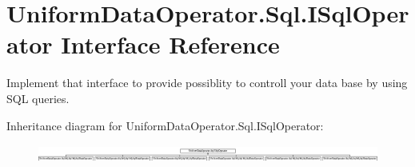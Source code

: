\hypertarget{interface_uniform_data_operator_1_1_sql_1_1_i_sql_operator}{}\section{Uniform\+Data\+Operator.\+Sql.\+I\+Sql\+Operator Interface Reference}
\label{interface_uniform_data_operator_1_1_sql_1_1_i_sql_operator}


Implement that interface to provide possiblity to controll your data base by using S\+QL queries.  


Inheritance diagram for Uniform\+Data\+Operator.\+Sql.\+I\+Sql\+Operator\+:\begin{figure}[H]
\begin{center}
\leavevmode
\includegraphics[height=0.590717cm]{d1/dad/interface_uniform_data_operator_1_1_sql_1_1_i_sql_operator}
\end{center}
\end{figure}
